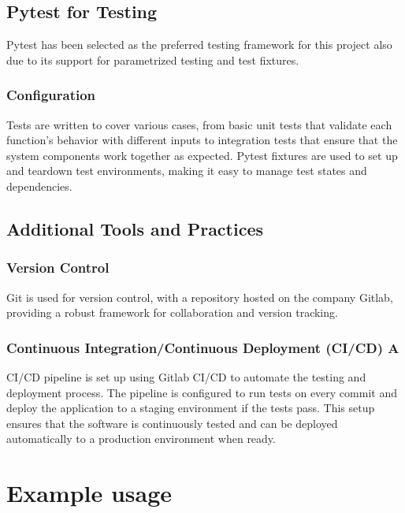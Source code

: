 \subsection{Pytest for Testing}

Pytest has been selected as the preferred testing framework for this project also due to its support for parametrized testing and test fixtures.\cite{pytest}

\subsubsection{Configuration}

Tests are written to cover various cases, from basic unit tests that validate each function's behavior with different inputs to integration tests that ensure that the system components work together as expected. Pytest fixtures are used to set up and teardown test environments, making it easy to manage test states and dependencies.\cite{pytest_fixtures}

\subsection{Additional Tools and Practices}

\subsubsection{Version Control}

Git is used for version control, with a repository hosted on the company Gitlab, providing a robust framework for collaboration and version tracking.

\subsubsection{Continuous Integration/Continuous Deployment (CI/CD) A}

CI/CD pipeline is set up using Gitlab CI/CD to automate the testing and deployment process. The pipeline is configured to run tests on every commit and deploy the application to a staging environment if the tests pass. This setup ensures that the software is continuously tested and can be deployed automatically to a production environment when ready.


\section{Example usage}

